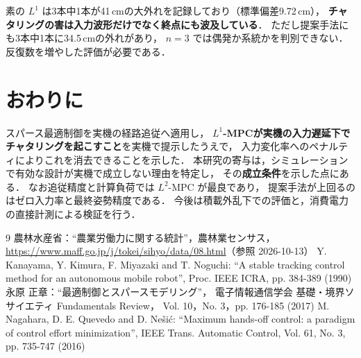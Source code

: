 \documentclass[a4jsme,9pt,dvipdfmx]{jsmepaper_robomec}
\begin{document}
素の $L^1$ は3本中1本が41\,cmの大外れを記録しており（標準偏差9.72\,cm），
\textbf{チャタリングの害は入力波形だけでなく終点にも波及している}．
ただし提案手法にも3本中1本に34.5\,cmの外れがあり，
$n=3$ では偶発か系統かを判別できない．反復数を増やした評価が必要である．

\section{おわりに}
スパース最適制御を実機の経路追従へ適用し，
\textbf{$L^1$-MPCが実機の入力遅延下でチャタリングを起こすこと}を実機で提示したうえで，
入力変化率へのペナルティによりこれを消去できることを示した．
本研究の寄与は，シミュレーションで有効な設計が実機で成立しない理由を特定し，
その\textbf{成立条件}を示した点にある．
なお追従精度と計算負荷では $L^2$-MPC が最良であり，
提案手法が上回るのはゼロ入力率と最終姿勢精度である．
今後は積載外乱下での評価と，消費電力の直接計測による検証を行う．

\begin{thebibliography}{9}
   農林水産省：``農業労働力に関する統計''，農林業センサス，
    \url{https://www.maff.go.jp/j/tokei/sihyo/data/08.html}（参照 2026-10-13）
   Y. Kanayama, Y. Kimura, F. Miyazaki and T. Noguchi:
    ``A stable tracking control method for an autonomous mobile robot'',
    Proc. IEEE ICRA, pp. 384-389 (1990)
   永原 正章：``最適制御とスパースモデリング''，
    電子情報通信学会 基礎・境界ソサイエティ Fundamentals Review，
    Vol. 10，No. 3，pp. 176-185 (2017)
   M. Nagahara, D. E. Quevedo and D. Ne\v{s}i\'{c}:
    ``Maximum hands-off control: a paradigm of control effort minimization'',
    IEEE Trans. Automatic Control, Vol. 61, No. 3, pp. 735-747 (2016)
\end{thebibliography}
\end{document}

